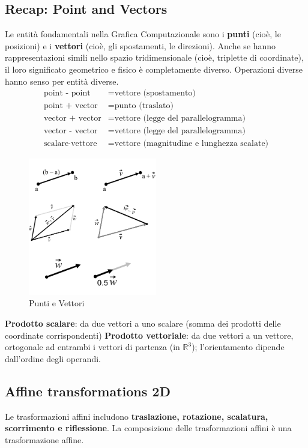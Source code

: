 \subsection{Recap: Point and Vectors}
Le entità fondamentali nella Grafica Computazionale sono i \textbf{punti} (cioè, le posizioni) e i \textbf{vettori} (cioè, gli spostamenti, le direzioni). Anche se hanno rappresentazioni simili nello spazio tridimensionale (cioè, triplette di coordinate), il loro significato geometrico e fisico è completamente diverso. Operazioni diverse hanno senso per entità diverse.
\begin{align*}
\text{point - point} & = \text{vettore (spostamento)} \\
\text{point + vector} & = \text{punto (traslato)} \\
\text{vector + vector} & = \text{vettore (legge del parallelogramma)} \\
\text{vector - vector} & = \text{vettore (legge del parallelogramma)} \\
\text{scalare} \cdot \text{vettore} & = \text{vettore (magnitudine e lunghezza scalate)}
\end{align*}
\begin{figure}[H]
    \centering
    \includegraphics[width=0.5\textwidth]{images/PointVec.png} 
    \caption{Punti e Vettori}
    \label{fig:immagine}
\end{figure}
\textbf{Prodotto scalare}: da due vettori a uno scalare (somma dei prodotti delle coordinate corrispondenti)  
\textbf{Prodotto vettoriale}: da due vettori a un vettore, ortogonale ad entrambi i vettori di partenza (in \(\mathbb{R}^3\)); l'orientamento dipende dall'ordine degli operandi.
\subsection{Affine transformations 2D}
Le trasformazioni affini includono \textbf{traslazione, rotazione, scalatura, scorrimento e riflessione}. La composizione delle trasformazioni affini è una trasformazione affine.

